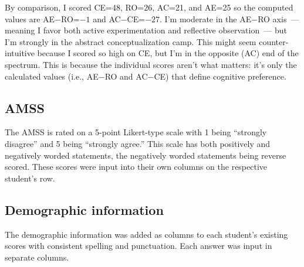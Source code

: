 By comparison, I scored CE=48, RO=26, AC=21, and AE=25 so the computed values are AE$-$RO=$-1$ and AC$-$CE=$-27$. I'm moderate in the AE$-$RO axis~--- meaning I favor both active experimentation and reflective observation~--- but I'm strongly in the abstract conceptualization camp. This might seem counter-intuitive because I scored so high on CE, but I'm in the opposite (AC) end of the spectrum. This is because the individual scores aren't what matters: it's only the calculated values (i.e., AE$-$RO and AC$-$CE) that define cognitive preference.

\subsection{AMSS}
The AMSS is rated on a 5-point Likert-type scale with 1 being ``strongly disagree'' and 5 being ``strongly agree.'' This scale has both positively and negatively worded statements, the negatively worded statements being reverse scored. These scores were input into their own columns on the respective student's row.

\subsection{Demographic information}
The demographic information was added as columns to each student's existing scores with consistent spelling and punctuation. Each answer was input in separate columns.
